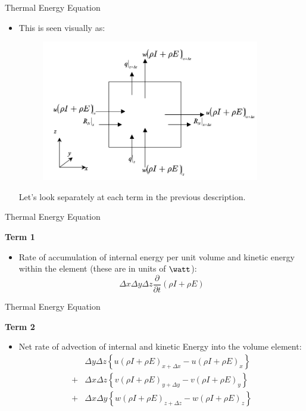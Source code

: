 \begin{frame}{Thermal Energy Equation}

\begin{itemize}
	\item This is seen visually as:
	\begin{figure}
		\includegraphics[width=0.9\textwidth]{thermo1}
	\end{figure}
	Let's look separately at each term in the previous description.
\end{itemize}
\end{frame}
\begin{frame}{Thermal Energy Equation}

\textbf{Term 1}
\begin{itemize}
	\item Rate of accumulation of internal energy per unit volume and kinetic energy within the element (these are in units of $\watt$):
	$$\Delta x \Delta y \Delta z \frac{\partial}{\partial t}(\rho I + \rho E)$$
\end{itemize}
\end{frame}
\begin{frame}{Thermal Energy Equation}

\textbf{Term 2}
\begin{itemize}
	\item Net rate of advection of internal and kinetic Energy into the volume element:
	\begin{align*}
		&\Delta y\Delta z \left\{u(\rho I + \rho E)_{x+\Delta x} - u(\rho I + \rho E)_{x} \right\} \\
		+ &\Delta x \Delta z\left\{v(\rho I + \rho E)_{y+\Delta y} - v(\rho I + \rho E)_{y} \right\}\\
		+ &\Delta x \Delta y\left\{w(\rho I + \rho E)_{z+\Delta z} - w(\rho I + \rho E)_{z} \right\}
	\end{align*}
\end{itemize}
\end{frame}
